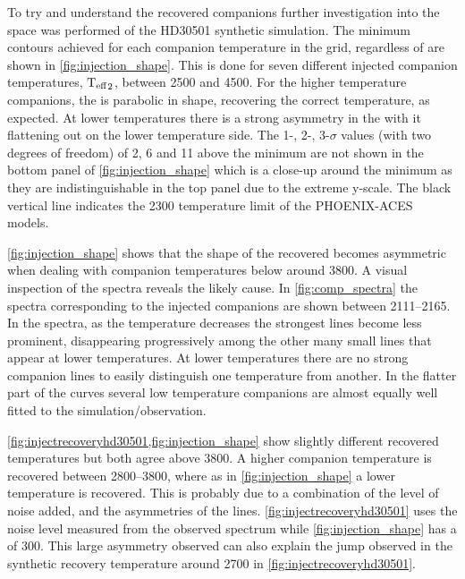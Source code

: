 To try and understand the recovered companions further investigation into the \textchisquared{} space was performed of the {HD30501} synthetic simulation.
The minimum \textchisquared{} contours achieved for each companion temperature in the grid, regardless of \Rvtwo{} are shown in \cref{fig:injection_shape}.
This is done for seven different injected companion temperatures, \({\textrm{T}_{\mathrm{eff}}}_{2}\), between 2500 and 4500\K{}.
For the higher temperature companions, the \textchisquared{} is parabolic in shape, recovering the correct temperature, as expected.
At lower temperatures there is a strong asymmetry in the \textchisquared{} with it flattening out on the lower temperature side.
The 1-, 2-, 3-\(\sigma\) values (with two degrees of freedom) of 2, 6 and 11 above the minimum \textchisquared{} are not shown in the bottom panel of \cref{fig:injection_shape} which is a close-up around the minimum \textchisquared{} as they are indistinguishable in the top panel due to the extreme \textchisquared{} y-scale.
The black vertical line indicates the 2300\K{} temperature limit of the {PHOENIX-ACES} models.

\cref{fig:injection_shape} shows that the shape of the recovered \textchisquared{} becomes asymmetric when dealing with companion temperatures below around 3800\K{}.
A visual inspection of the spectra reveals the likely cause.
In \cref{fig:comp_spectra} the spectra corresponding to the injected companions are shown between 2111--2165\nm{}.
In the spectra, as the temperature decreases the strongest lines become less prominent, disappearing progressively among the other many small lines that appear at lower temperatures.
At lower temperatures there are no strong companion lines to easily distinguish one temperature from another.
In the flatter part of the \textchisquared{} curves several low temperature companions are almost equally well fitted to the simulation/observation.

\cref{fig:injectrecoveryhd30501,fig:injection_shape} show slightly different recovered temperatures but both agree above 3800\K{}.
A higher companion temperature is recovered between 2800--3800\K{}, where as in \cref{fig:injection_shape} a lower temperature is recovered.
This is probably due to a combination of the level of noise added, and the asymmetries of the \textchisquared{} lines.
\cref{fig:injectrecoveryhd30501} uses the noise level measured from the observed spectrum while \cref{fig:injection_shape} has a \snr{} of 300.
This large asymmetry observed can also explain the jump observed in the synthetic recovery temperature around 2700\K{} in \cref{fig:injectrecoveryhd30501}.

